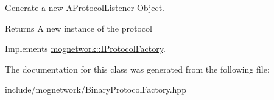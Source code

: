 Generate a new A\-Protocol\-Listener Object. 

\begin{DoxyReturn}{Returns}
A new instance of the protocol 
\end{DoxyReturn}


Implements \hyperlink{classmognetwork_1_1_i_protocol_factory_a9ed1ba40ab28b76a1285985b1d3662d6}{mognetwork\-::\-I\-Protocol\-Factory}.



The documentation for this class was generated from the following file\-:\begin{DoxyCompactItemize}
\item 
include/mognetwork/Binary\-Protocol\-Factory.\-hpp\end{DoxyCompactItemize}
